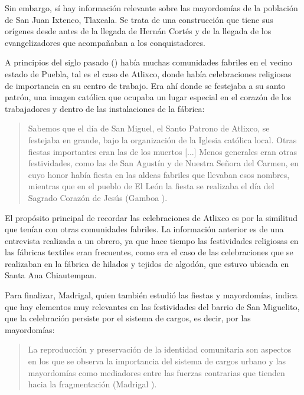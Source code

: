 \documentclass[14pt,letterpaper,twoside]{extbook} %
\begin{document}
Sin embargo, sí hay información relevante sobre las mayordomías de la población de San Juan Ixtenco, Tlaxcala. Se trata de una construcción que tiene sus orígenes desde antes de la llegada de Hernán Cortés y de la llegada de los evangelizadores que acompañaban a los conquistadores.

A principios del siglo pasado () había muchas comunidades fabriles en el vecino estado de Puebla, tal es el caso de Atlixco, donde había celebraciones religiosas de importancia en su centro de trabajo. Era ahí donde se festejaba a su santo patrón, una imagen católica que ocupaba un lugar especial en el corazón de los trabajadores y dentro de las instalaciones de la fábrica:

\begin{quotation}
\noindent Sabemos que el día de San Miguel, el Santo Patrono de Atlixco, se festejaba en grande, bajo la organización de la Iglesia católica local. Otras fiestas importantes eran las de los muertos [...] Menos generales eran otras festividades, como las de San Agustín y de Nuestra Señora del Carmen, en cuyo honor había fiesta en las aldeas fabriles que llevaban esos nombres, mientras que en el pueblo de El León la fiesta se realizaba el día del Sagrado Corazón de Jesús (Gamboa ).
\end{quotation}

\noindent El propósito principal de recordar las celebraciones de Atlixco es por la similitud que tenían con otras comunidades fabriles. La información anterior es de una entrevista realizada a un obrero, ya que hace tiempo las festividades religiosas en las fábricas textiles eran frecuentes, como era el caso de las celebraciones que se realizaban en la fábrica de hilados y tejidos de algodón, que estuvo ubicada en Santa Ana Chiautempan.

Para finalizar, Madrigal, quien también estudió las fiestas y mayordomías, indica que hay elementos muy relevantes en las festividades del barrio de San Miguelito, que la celebración persiste por el sistema de cargos, es decir, por las mayordomías:

\begin{quotation}
\noindent La reproducción y preservación de la identidad comunitaria son aspectos en los que se observa la importancia del sistema de cargos urbano y las mayordomías como mediadores entre las fuerzas contrarias que tienden hacia la fragmentación (Madrigal ).
\end{quotation}
\end{document}
